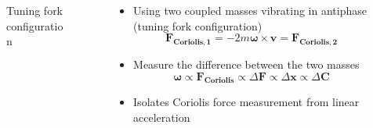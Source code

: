 \documentclass[10pt]{beamer}
\begin{document}
\begin{frame}
\begin{columns}
\begin{column}{.48\textwidth}
\begin{figure}
        \caption{Tuning fork configuration}
        \end{figure}
    \end{column}
    \hfill
    \begin{column}{.60\textwidth}
        \begin{itemize}
            \item Using two coupled masses vibrating in antiphase (tuning fork configuration)
            \begin{equation*}
                \mathbf{F_{Coriolis, 1}} = - 2 m \mathbf{\omega} \times \mathbf{v} = \mathbf{F_{Coriolis, 2}}
            \end{equation*}
            \item Measure the difference between the two masses
            \begin{equation*}
                \mathbf{\omega} \propto \mathbf{F_{Coriolis}} \propto \Delta \mathbf{F} \propto \Delta \mathbf{x} \propto \Delta \mathbf{C}
            \end{equation*}
            \item Isolates Coriolis force measurement from linear acceleration
        \end{itemize}
    \end{column}
\end{columns}
\end{frame}
\end{document}
